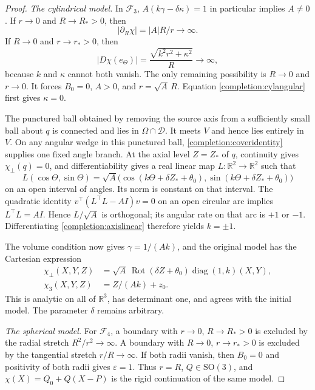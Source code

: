 \documentclass[11pt,a4paper]{article}
\numberwithin{equation}{section}
\theoremstyle{plain}
\theoremstyle{definition}
\theoremstyle{remark}
\begin{document}
\begin{proof}
\emph{The cylindrical model.}
In $\mathcal F_3$, $A(k\gamma-\delta\kappa)=1$ in particular implies $A\ne0$.
If $r\to0$ and $R\to R_*>0$, then
\[
                    |\partial_R\chi|=|A|R/r\longrightarrow\infty.
\]
If $R\to0$ and $r\to r_*>0$, then
\begin{equation}\label{completion:cylangular}
          |D\chi(e_\Theta)|=\frac{\sqrt{k^2r^2+\kappa^2}}{R}
                           \longrightarrow\infty,
\end{equation}
because $k$ and $\kappa$ cannot both vanish. The only remaining possibility is
$R\to0$ and $r\to0$. It forces $B_0=0$, $A>0$, and
$r=\sqrt A\,R$. Equation \eqref{completion:cylangular} first gives $\kappa=0$.

The punctured ball obtained by removing the source axis from a sufficiently
small ball about $q$ is connected and lies in $\Omega\cap\mathcal D$.
It meets $V$ and hence lies entirely in $V$. On any angular wedge in
this punctured ball, \eqref{completion:coveridentity} supplies one fixed
angle branch. At the axial level $Z=Z_*$ of $q$, continuity gives
$\chi_\perp(q)=0$, and differentiability gives a real linear map
$L:\mathbb R^2\to\mathbb R^2$ such that
\begin{equation}\label{completion:axislinear}
 L(\cos\Theta,\sin\Theta)
  =\sqrt A\bigl(\cos(k\Theta+\delta Z_*+\theta_0),
                 \sin(k\Theta+\delta Z_*+\theta_0)\bigr)
\end{equation}
on an open interval of angles. Its norm is constant on that interval.
The quadratic identity
$v^{\top}(L^{\top}L-AI)v=0$ on an open circular arc implies $L^{\top}L=AI$.
Hence $L/\sqrt A$ is orthogonal; its angular rate on that arc is $+1$
or $-1$. Differentiating \eqref{completion:axislinear} therefore yields
$k=\pm1$.

The volume condition now gives $\gamma=1/(Ak)$, and the original model has
the Cartesian expression
\begin{equation}\label{completion:cylremoval}
 \begin{aligned}
 \chi_\perp(X,Y,Z)
   &=\sqrt A\,\operatorname{Rot}(\delta Z+\theta_0)
                    \operatorname{diag}(1,k)(X,Y),\\
 \chi_3(X,Y,Z)&=Z/(Ak)+z_0.
 \end{aligned}
\end{equation}
This is analytic on all of $\mathbb R^3$, has determinant one, and
agrees with the initial model. The parameter $\delta$ remains arbitrary.

\emph{The spherical model.}
For $\mathcal F_4$, a boundary with $r\to0$, $R\to R_*>0$ is excluded
by the radial stretch $R^2/r^2\to\infty$. A boundary with $R\to0$,
$r\to r_*>0$ is excluded by the tangential stretch $r/R\to\infty$.
If both radii vanish, then $B_0=0$ and positivity of both radii gives
$\varepsilon=1$. Thus $r=R$, $Q\in\mathrm{SO}(3)$, and
$\chi(X)=Q_0+Q(X-P)$ is the rigid continuation of the same model.


\end{proof}
\end{document}
